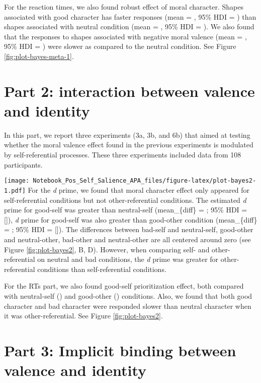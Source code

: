 \documentclass[
  english,
  man]{apa6}
\begin{document}
For the reaction times, we also found robust effect of moral character. Shapes associated with good character has faster responses (mean = , 95\% HDI = ) than shapes associated with neutral condition (mean = , 95\% HDI = ). We also found that the responses to shapes associated with negative moral valence (mean = , 95\% HDI = ) were slower as compared to the neutral condition. See Figure \ref{fig:plot-bayes-meta-1}.

\hypertarget{part-2-interaction-between-valence-and-identity}{%
\section{Part 2: interaction between valence and identity}\label{part-2-interaction-between-valence-and-identity}}

In this part, we report three experiments (3a, 3b, and 6b) that aimed at testing whether the moral valence effect found in the previous experiments is modulated by self-referential processes. These three experiments included data from 108 participants.

\texttt{[image: Notebook\_Pos\_Self\_Salience\_APA\_files/figure-latex/plot-bayes2-1.pdf]}
For the \emph{d} prime, we found that moral character effect only appeared for self-referential conditions but not other-referential conditions. The estimated \emph{d} prime for good-self was greater than neutral-self (mean\_\{diff\} = ; 95\% HDI = {[}{]}), \emph{d} prime for good-self was also greater than good-other condition (mean\_\{diff\} = ; 95\% HDI = {[}{]}). The differences between bad-self and neutral-self, good-other and neutral-other, bad-other and neutral-other are all centered around zero (see Figure \ref{fig:plot-bayes2}, B, D). However, when comparing self- and other-referential on neutral and bad conditions, the \emph{d} prime was greater for other-referential conditions than self-referential conditions.

For the RTs part, we also found good-self prioritization effect, both compared with neutral-self () and good-other () conditions. Also, we found that both good character and bad character were responded slower than neutral character when it was other-referential. See Figure \ref{fig:plot-bayes2}.

\hypertarget{part-3-implicit-binding-between-valence-and-identity}{%
\section{Part 3: Implicit binding between valence and identity}\label{part-3-implicit-binding-between-valence-and-identity}}
\end{document}
